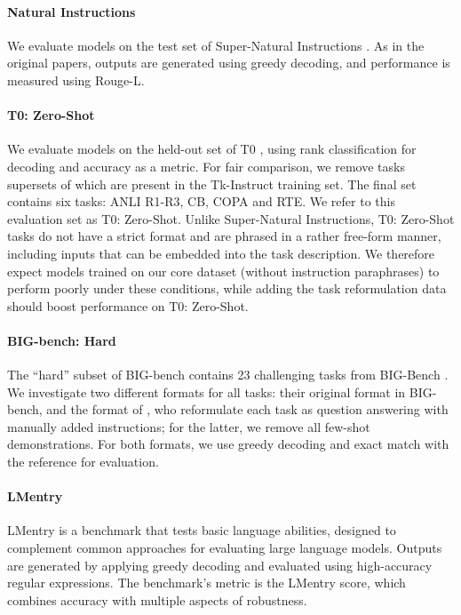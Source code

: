 \paragraph{Natural Instructions} We evaluate models on the test set of Super-Natural Instructions \citep{mishra-etal-2022-cross, supernaturalinstructions}. As in the original papers, outputs are generated using greedy decoding, and performance is measured using Rouge-L.

\paragraph{T0: Zero-Shot} We evaluate models on the held-out set of T0 \citep{sanh2021multitask}, using rank classification for decoding and accuracy as a metric. For fair comparison, we remove tasks supersets of which are present in the Tk-Instruct training set. The final set contains six tasks: ANLI R1-R3, CB, COPA and RTE. We refer to this evaluation set as T0: Zero-Shot. Unlike Super-Natural Instructions, T0: Zero-Shot tasks do not have a strict format and are phrased in a rather free-form manner, including inputs that can be embedded into the task description. We therefore expect models trained on our core dataset (without instruction paraphrases) to perform poorly under these conditions, while adding the task reformulation data should boost performance on T0: Zero-Shot.

\paragraph{BIG-bench: Hard} The ``hard'' subset of BIG-bench \citep{bbh} contains 23 challenging tasks from BIG-Bench \cite{srivastava2022beyond}. We investigate two different formats for all tasks: their original format in BIG-bench, and the format of \citet{bbh}, who reformulate each task as question answering with manually added instructions; for the latter, we remove all few-shot demonstrations. For both formats, we use greedy decoding and exact match with the reference for evaluation.

\paragraph{LMentry}
LMentry \citep{lmentry} is a benchmark that tests basic language abilities, designed to complement common approaches for evaluating large language models. Outputs are generated by applying greedy decoding and evaluated using high-accuracy regular expressions. The benchmark's metric is the LMentry score, which combines accuracy with multiple aspects of robustness.

